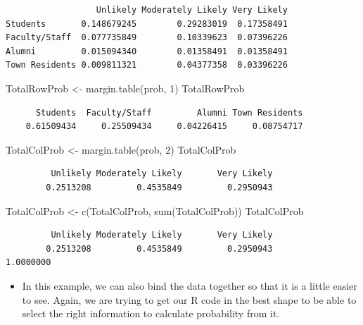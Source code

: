 \documentclass[
  letterpaper,
  DIV=11,
  numbers=noendperiod]{scrreprt}
\newenvironment{Shaded}{\begin{snugshade}}{\end{snugshade}}
\newcommand{\DecValTok}[1]{\textcolor[rgb]{0.68,0.00,0.00}{#1}}
\newcommand{\FunctionTok}[1]{\textcolor[rgb]{0.28,0.35,0.67}{#1}}
\newcommand{\NormalTok}[1]{\textcolor[rgb]{0.00,0.23,0.31}{#1}}
\newcommand{\OtherTok}[1]{\textcolor[rgb]{0.00,0.23,0.31}{#1}}
\providecommand{\tightlist}{%
  \setlength{\itemsep}{0pt}\setlength{\parskip}{0pt}}\usepackage{longtable,booktabs,array}
\begin{document}
\begin{verbatim}
                  Unlikely Moderately Likely Very Likely
Students       0.148679245        0.29283019  0.17358491
Faculty/Staff  0.077735849        0.10339623  0.07396226
Alumni         0.015094340        0.01358491  0.01358491
Town Residents 0.009811321        0.04377358  0.03396226
\end{verbatim}

\begin{Shaded}
\begin{Highlighting}[]
\NormalTok{TotalRowProb }\OtherTok{\textless{}{-}} \FunctionTok{margin.table}\NormalTok{(prob, }\DecValTok{1}\NormalTok{)}
\NormalTok{TotalRowProb}
\end{Highlighting}
\end{Shaded}

\begin{verbatim}
      Students  Faculty/Staff         Alumni Town Residents 
    0.61509434     0.25509434     0.04226415     0.08754717 
\end{verbatim}

\begin{Shaded}
\begin{Highlighting}[]
\NormalTok{TotalColProb }\OtherTok{\textless{}{-}} \FunctionTok{margin.table}\NormalTok{(prob, }\DecValTok{2}\NormalTok{)}
\NormalTok{TotalColProb}
\end{Highlighting}
\end{Shaded}

\begin{verbatim}
         Unlikely Moderately Likely       Very Likely 
        0.2513208         0.4535849         0.2950943 
\end{verbatim}

\begin{Shaded}
\begin{Highlighting}[]
\NormalTok{TotalColProb }\OtherTok{\textless{}{-}} \FunctionTok{c}\NormalTok{(TotalColProb, }\FunctionTok{sum}\NormalTok{(TotalColProb))}
\NormalTok{TotalColProb}
\end{Highlighting}
\end{Shaded}

\begin{verbatim}
         Unlikely Moderately Likely       Very Likely                   
        0.2513208         0.4535849         0.2950943         1.0000000 
\end{verbatim}

\begin{itemize}
\tightlist
\item
  In this example, we can also bind the data together so that it is a
  little easier to see. Again, we are trying to get our R code in the
  best shape to be able to select the right information to calculate
  probability from it.
\end{itemize}
\end{document}
